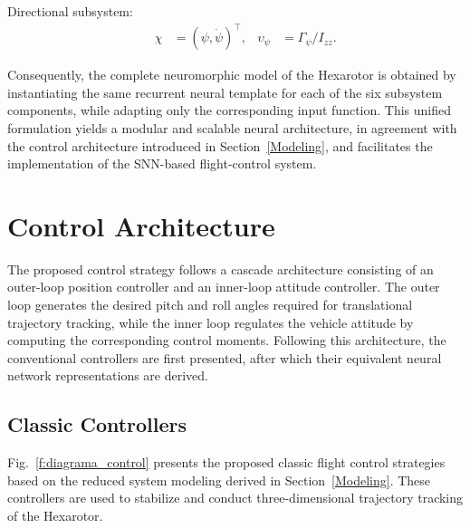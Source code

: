 \documentclass[conference]{IEEEtran}
\begin{document}
Directional subsystem:
\begin{equation*}
\begin{aligned}
& & \chi&=(\psi,\dot\psi)^\top, & \upsilon_\psi&=\Gamma_\psi/I_{zz}.
\end{aligned}
\end{equation*}

Consequently, the complete neuromorphic model of the Hexarotor is obtained by instantiating the same recurrent neural template for each of the six subsystem components, while adapting only the corresponding input function. This unified formulation yields a modular and scalable neural architecture, in agreement with the control architecture introduced in Section~\ref{Modeling}, and facilitates the implementation of the SNN-based flight-control system.




\section{Control Architecture}\label{Control}



The proposed control strategy follows a cascade architecture consisting of an outer-loop position controller and an inner-loop attitude controller. The outer loop generates the desired pitch and roll angles required for translational trajectory tracking, while the inner loop regulates the vehicle attitude by computing the corresponding control moments. Following this architecture, the conventional controllers are first presented, after which their equivalent neural network representations are derived.



\subsection{Classic Controllers}\label{Control_Simulink}

Fig.~\ref{f:diagrama_control} presents the proposed classic flight control strategies based on the reduced system modeling derived in Section~\ref{Modeling}. These controllers are used to stabilize and conduct three-dimensional trajectory tracking of the Hexarotor.
\end{document}
